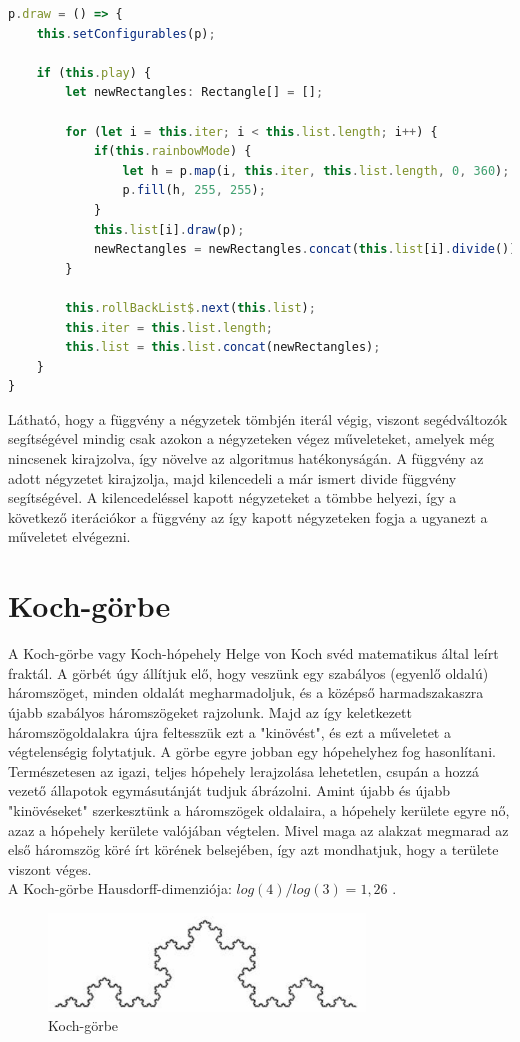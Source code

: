 \begin{lstlisting}[language=typescript]
p.draw = () => {
	this.setConfigurables(p);

	if (this.play) {
		let newRectangles: Rectangle[] = [];
		
		for (let i = this.iter; i < this.list.length; i++) {
			if(this.rainbowMode) {
				let h = p.map(i, this.iter, this.list.length, 0, 360);
				p.fill(h, 255, 255);
			}
			this.list[i].draw(p);
			newRectangles = newRectangles.concat(this.list[i].divide());
		}
		
		this.rollBackList$.next(this.list);
		this.iter = this.list.length;
		this.list = this.list.concat(newRectangles);
	}
}
\end{lstlisting}
Látható, hogy a függvény a négyzetek tömbjén iterál végig, viszont segédváltozók segítségével mindig csak azokon a négyzeteken végez műveleteket, amelyek még nincsenek kirajzolva, így növelve az algoritmus hatékonyságán. A függvény az adott négyzetet kirajzolja, majd kilencedeli a már ismert divide függvény segítségével. A kilencedeléssel kapott négyzeteket a tömbbe helyezi, így a következő iterációkor a függvény az így kapott négyzeteken fogja a ugyanezt a műveletet elvégezni.

	
\section{Koch-görbe}
A Koch-görbe vagy Koch-hópehely Helge von Koch svéd matematikus által leírt fraktál. A görbét úgy állítjuk elő, hogy veszünk egy szabályos (egyenlő oldalú) háromszöget, minden oldalát megharmadoljuk, és a középső harmadszakaszra újabb szabályos háromszögeket rajzolunk. Majd az így keletkezett háromszögoldalakra újra feltesszük ezt a "kinövést", és ezt a műveletet a végtelenségig folytatjuk. A görbe egyre jobban egy hópehelyhez fog hasonlítani. Természetesen az igazi, teljes hópehely lerajzolása lehetetlen, csupán a hozzá vezető állapotok egymásutánját tudjuk ábrázolni. Amint újabb és újabb "kinövéseket" szerkesztünk a háromszögek oldalaira, a hópehely kerülete egyre nő, azaz a hópehely kerülete valójában végtelen. Mivel maga az alakzat megmarad az első háromszög köré írt körének belsejében, így azt mondhatjuk, hogy a területe viszont véges.\\
A Koch-görbe Hausdorff-dimenziója: $log(4)/log(3) = 1,26$ \cite{koch-gorbe-wiki}.
\begin{figure}[!ht]
	\begin{center}
		\includegraphics[width=0.75\textwidth]{img/KochCurve}
		\caption[labelInTOC]{Koch-görbe}
	\end{center}
\end{figure}
